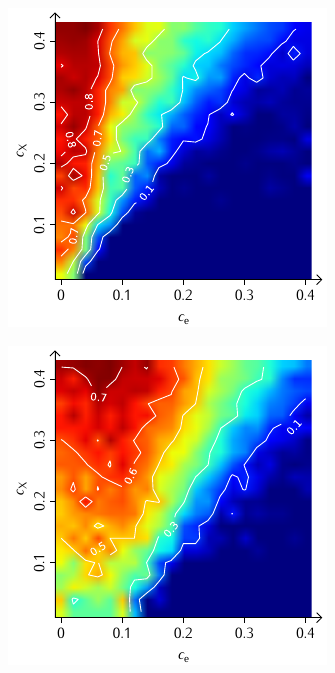 \documentclass[a4paper, 10pt, twoside, openany]{book} %
\begin{document}
\begin{figure}
\begin{minipage}[t]{0.48\textwidth}
        \includegraphics[width=\textwidth]{Abbildungen/Phasendiagramme/Konturen/H_penalty_cluster_K.pdf}
        \label{H_penalty_cluster_K}
    \end{minipage}
    \begin{minipage}[t]{0.48\textwidth}
        \includegraphics[width=\textwidth]{Abbildungen/Phasendiagramme/Konturen/H_random_K.pdf}

\end{minipage}
\end{figure}
\end{document}
